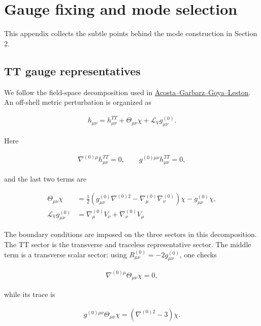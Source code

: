 \section{Gauge fixing and mode selection}\label{gauge-fixing-and-mode-selection}

This appendix collects the subtle points behind the mode construction in Section 2.

\subsection{TT gauge representatives}\label{tt-gauge-representatives}

We follow the field-space decomposition used in \href{https://arxiv.org/pdf/2109.06938}{Acosta--Garbarz--Goya--Leston}. An off-shell metric perturbation is organized as

\begin{align}
h_{\mu\nu}
=h_{\mu\nu}^{TT}
+\Theta_{\mu\nu}\chi
+\mathcal{L}_{V}g^{(0)}_{\mu\nu}.
\end{align}

Here

\begin{align}
\nabla^{(0)\mu}h_{\mu\nu}^{TT}=0,\qquad
g^{(0)\mu\nu}h_{\mu\nu}^{TT}=0,
\end{align}

and the last two terms are

\begin{align}
\Theta _{\mu \nu}\chi & =\frac{1}{2}(g_{\mu \nu}^{(0)}\nabla ^{(0)2}-\nabla ^{(0)}_{\mu}\nabla ^{(0)}_{\nu})\chi-g^{(0)}_{\mu \nu}\chi , \\
\mathcal{L}_{V}g^{(0)}_{\mu\nu} & =\nabla ^{(0)}_{\mu}V_{\nu}+\nabla ^{(0)}_{\nu}V_{\mu}
\end{align}

The boundary conditions are imposed on the three sectors in this decomposition. The TT sector is the transverse and traceless representative sector. The middle term is a transverse scalar sector: using \(R^{(0)}_{\mu\nu}=-2g^{(0)}_{\mu\nu}\), one checks

\begin{align}
\nabla^{(0)\mu}\Theta_{\mu\nu}\chi=0,
\end{align}

while its trace is

\begin{align}
g^{(0)\mu\nu}\Theta_{\mu\nu}\chi
=\left(\nabla^{(0)2}-3\right)\chi .
\end{align}

